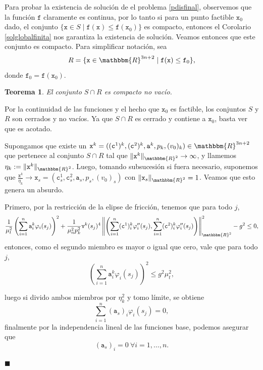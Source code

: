 \documentclass[a4paper,10pt]{book}
\newcommand{\R}{\mathbbm{R}}
\newtheorem{teo}{Teorema}[section]
\newenvironment{dem}{\vspace*{-0.1cm}{\it Demostraci\'on:}}{\hfill
$\blacksquare$\\}
\begin{document}
Para probar la existencia de solución de el problema \eqref{pdisfinal}, observemos que la función $\texttt{f}$ claramente es continua, por lo tanto si para un punto factible $\texttt{x}_0$ dado, el conjunto $\{\texttt{x}\in S\mid \texttt{f}(\texttt{x})\leq \texttt{f}(\texttt{x}_0)\}$ es compacto, entonces el Corolario \ref{solglobalfinita} nos garantiza la existencia de solución. Veamos entonces que este conjunto es compacto. Para simplificar notación, sea 
$$R=\{\texttt{x}\in\R^{3n+2}\mid \texttt{f}(\texttt{x})\leq \texttt{f}_0\},$$
donde $\texttt{f}_0=\texttt{f}(\texttt{x}_0)$.
\begin{teo}
El conjunto $S\cap R$ es compacto no vacío.
\end{teo}
\begin{dem}
Por la continuidad de las funciones y el hecho que $\texttt{x}_0$ es factible, los conjuntos $S$ y $R$ son cerrados y no vacíos. Ya que $S\cap R$ es cerrado y contiene a $\texttt{x}_0$, basta ver que es acotado.

Supongamos que existe un $\texttt{x}^k=((\texttt{c}^{1})^k,(\texttt{c}^{2})^k,\texttt{a}^k,p_k,(v_0)_k)\in\R^{3n+2}$ que pertenece al conjunto $S\cap R$  tal que $\|\texttt{x}^k\|_{\R^2}\to\infty$, y llamemos $\eta_k:=\|\texttt{x}^k\|_{\R^2}$. Luego, tomando subsucesión si fuera necesario, suponemos que $\frac{\texttt{x}^k}{\eta_k}\to\texttt{x}_s=(\texttt{c}^1_s,\texttt{c}^2_s,\texttt{a}_s,p_s,(v_0)_s)$ con $\|\texttt{x}_s\|_{\R^2}=1$. Veamos que esto genera un absurdo.

Primero, por la restricción de la elipse de fricción, tenemos que para todo $j$, $$\frac{1}{\mu_t^2} \left(\sum_{i=1}^n\texttt{a}^k_i\varphi_i(s_j)\right)^2 + \frac{1}{\mu_n^2 p_k^2}\texttt{v}^k(s_j)^4\left\| \left(\sum_{i=1}^n(\texttt{c}^{1})^k_i\varphi_i''(s_j), \sum_{i=1}^n(\texttt{c}^{2})^k_i\varphi_i''(s_j)\right) \right\|_{\R^2}^2-g^2\leq 0,$$
entonces, como el segundo miembro es mayor o igual que cero, vale que para todo $j$,
\begin{equation}\label{restriccionfriccionmodificada}
    \left(\sum_{i=1}^n\texttt{a}^k_i\varphi_i(s_j)\right)^2\leq g^2\mu_t^2,
\end{equation}



luego si divido ambos miembros por $\eta_k^2$ y tomo límite, se obtiene
$$\sum_{i=1}^n(\texttt{a}_s)_i\varphi_i(s_j)=0,$$
finalmente por la independencia lineal de las funciones base, podemos asegurar que
\begin{equation}\label{aigualacero}
    (\texttt{a}_s)_i=0 \ \forall i=1,\ldots,n.
\end{equation}


\end{dem}
\end{document}
